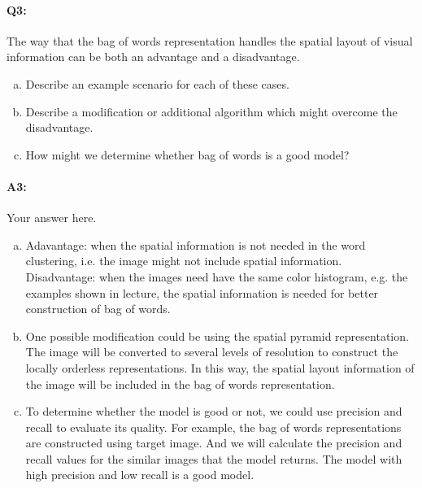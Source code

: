 
\pagebreak
\paragraph{Q3:} The way that the bag of words representation handles the spatial layout of visual information can be both an advantage and a disadvantage.
\begin{enumerate}[(a)]
    \item Describe an example scenario for each of these cases.
    \item Describe a modification or additional algorithm which might overcome the disadvantage.

    \item How might we determine whether bag of words is a good model?
\end{enumerate}
\paragraph{A3:} Your answer here.

\begin{enumerate}[(a)]

    \item Adavantage: when the spatial information is not needed in the word clustering, i.e. the image might not include spatial information.\\
          Disadvantage: when the images need have the same color histogram, e.g. the examples shown in lecture, the spatial information is needed for better construction of bag of words.

    \item One possible modification could be using the spatial pyramid representation. The image will be converted to several levels of resolution to construct the locally orderless representations. In this way, the spatial layout information of the image will be included in the bag of words representation.

    \item To determine whether the model is good or not, we could use precision and recall to evaluate its quality. For example, the bag of words representations are constructed using target image. And we will calculate the precision and recall values for the similar images that the model returns. The model with high precision and low recall is a good model.

\end{enumerate}




